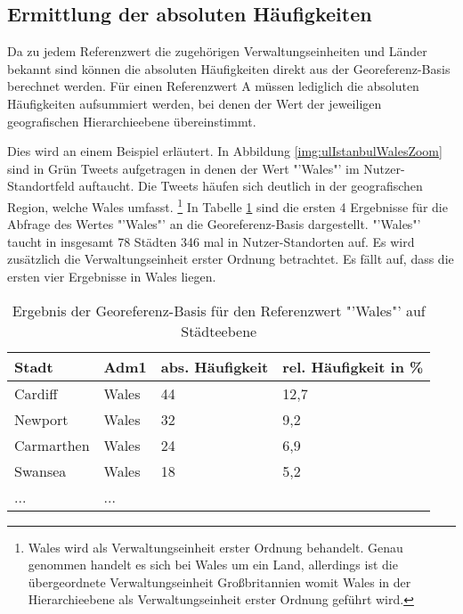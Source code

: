 			

		\subsection{Ermittlung der absoluten Häufigkeiten} 

			Da zu jedem Referenzwert die zugehörigen Verwaltungseinheiten und Länder bekannt sind können die absoluten Häufigkeiten direkt aus der Georeferenz-Basis berechnet werden.
			Für einen Referenzwert A müssen lediglich die absoluten Häufigkeiten aufsummiert werden, bei denen der Wert der jeweiligen geografischen Hierarchieebene übereinstimmt.

			Dies wird an einem Beispiel erläutert.
			In Abbildung \ref{img:ulIstanbulWalesZoom} sind in Grün Tweets aufgetragen in denen der Wert "'Wales"' im Nutzer-Standortfeld auftaucht.
			Die Tweets häufen sich deutlich in der geografischen Region, welche Wales umfasst. \footnote{Wales wird als Verwaltungseinheit erster Ordnung behandelt. Genau genommen handelt es sich bei Wales um ein Land, allerdings ist die übergeordnete Verwaltungseinheit Großbritannien womit Wales in der Hierarchieebene als Verwaltungseinheit erster Ordnung geführt wird.} 
			In Tabelle \ref{tab:walesCity} sind die ersten 4 Ergebnisse für die Abfrage des Wertes "'Wales"' an die Georeferenz-Basis dargestellt.
			"'Wales"' taucht in insgesamt 78 Städten 346 mal in Nutzer-Standorten auf.
			Es wird zusätzlich die Verwaltungseinheit erster Ordnung betrachtet.
			Es fällt auf, dass die ersten vier Ergebnisse in Wales liegen.

			\begin{table}[h]
			\centering
			\caption{Ergebnis der Georeferenz-Basis für den Referenzwert "'Wales"' auf Städteebene}
			\label{tab:walesCity}
			\begin{tabular}{|l|l|l|l|}
			\hline
			Stadt      & Adm1 & abs. Häufigkeit & rel. Häufigkeit in \% \\ \hline \hline
			Cardiff    & Wales & 44 			& 12,7 \\ \hline
			Newport    & Wales & 32 			& 9,2  \\ \hline
			Carmarthen & Wales & 24 			& 6,9  \\ \hline
			Swansea    & Wales & 18 			& 5,2  \\ \hline
			...    & ... \\ \hline
			\end{tabular}
			\end{table}

